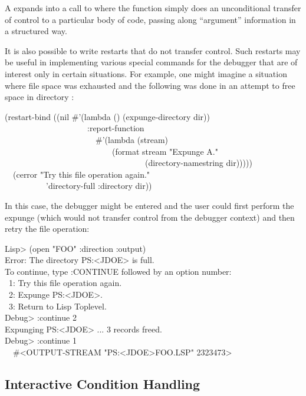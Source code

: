A  expands into a call to  where the function
simply does an unconditional transfer of control to a particular body
of code, passing along ``argument'' information in a structured way.

It is also possible to write restarts that do not transfer control. Such
restarts may be useful in implementing various special commands for the
debugger that are of interest only in certain situations. For example,
one might imagine a situation where file space was exhausted and the
following was done in an attempt to free space in directory :
\begin{lisp}
(restart-bind ((nil \#'(lambda () (expunge-directory dir)) \\
~~~~~~~~~~~~~~~~~~~~:report-function \\
~~~~~~~~~~~~~~~~~~~~~~\#'(lambda (stream) \\
~~~~~~~~~~~~~~~~~~~~~~~~~~(format stream "Expunge {\Xtilde}A." \\
~~~~~~~~~~~~~~~~~~~~~~~~~~~~~~~~~~(directory-namestring dir))))) \\
~~(cerror "Try this file operation again." \\
~~~~~~~~~~'directory-full :directory dir))
\end{lisp}
In this case, the debugger might be entered and the user could first
perform the expunge (which would not transfer control from the debugger
context) and then retry the file operation:
\begin{lisp}
Lisp> (open "FOO" :direction :output) \\
Error: The directory PS:<JDOE> is full. \\
To continue, type :CONTINUE followed by an option number: \\
~1: Try this file operation again. \\
~2: Expunge PS:<JDOE>. \\
~3: Return to Lisp Toplevel. \\
Debug> :continue 2 \\
Expunging PS:<JDOE> ... 3 records freed. \\
Debug> :continue 1 \\
~\EV\ \#<OUTPUT-STREAM "PS:<JDOE>FOO.LSP" 2323473>
\end{lisp}


\subsection{Interactive Condition Handling}

